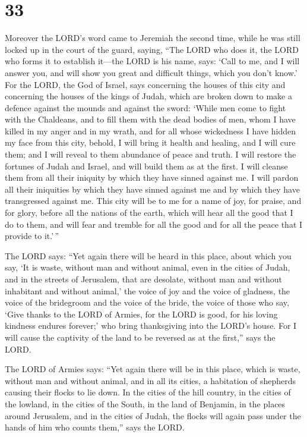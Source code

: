 \hypertarget{section-32}{%
\section{33}\label{section-32}}

 Moreover the LORD's word came to Jeremiah the second time,
while he was still locked up in the court of the guard, saying,
 ``The LORD who does it, the LORD who forms it to establish
it---the LORD is his name, says:  `Call to me, and I will
answer you, and will show you great and difficult things, which you
don't know.'  For the LORD, the God of Israel, says
concerning the houses of this city and concerning the houses of the
kings of Judah, which are broken down to make a defence against the
mounds and against the sword:  `While men come to fight with
the Chaldeans, and to fill them with the dead bodies of men, whom I have
killed in my anger and in my wrath, and for all whose wickedness I have
hidden my face from this city,  behold, I will bring it
health and healing, and I will cure them; and I will reveal to them
abundance of peace and truth.  I will restore the fortunes
of Judah and Israel, and will build them as at the first.  I
will cleanse them from all their iniquity by which they have sinned
against me. I will pardon all their iniquities by which they have sinned
against me and by which they have transgressed against me. 
This city will be to me for a name of joy, for praise, and for glory,
before all the nations of the earth, which will hear all the good that I
do to them, and will fear and tremble for all the good and for all the
peace that I provide to it.'\,''

 The LORD says: ``Yet again there will be heard in this
place, about which you say, `It is waste, without man and without
animal, even in the cities of Judah, and in the streets of Jerusalem,
that are desolate, without man and without inhabitant and without
animal,'  the voice of joy and the voice of gladness, the
voice of the bridegroom and the voice of the bride, the voice of those
who say, `Give thanks to the LORD of Armies, for the LORD is good, for
his loving kindness endures forever;' who bring thanksgiving into the
LORD's house. For I will cause the captivity of the land to be reversed
as at the first,'' says the LORD.

 The LORD of Armies says: ``Yet again there will be in this
place, which is waste, without man and without animal, and in all its
cities, a habitation of shepherds causing their flocks to lie down.
 In the cities of the hill country, in the cities of the
lowland, in the cities of the South, in the land of Benjamin, in the
places around Jerusalem, and in the cities of Judah, the flocks will
again pass under the hands of him who counts them,'' says the LORD.

